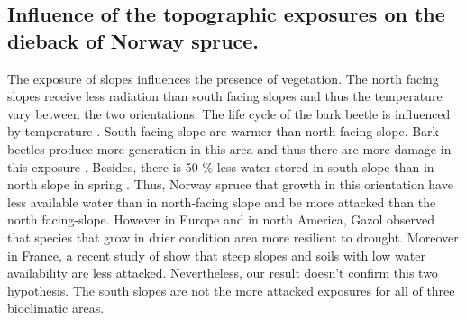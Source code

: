 \documentclass[3p,procedia]{elsarticle}
\begin{document}
\subsection{Influence of the topographic exposures on the dieback of Norway spruce.}


The exposure of slopes influences the presence of vegetation. The north facing slopes receive less radiation than south facing slopes and thus the temperature vary between the two orientations.
The life cycle of the bark beetle is influenced by temperature \citep{baier_phenipscomprehensive_2007}. 
South facing slope are warmer than north facing slope.
Bark beetles produce more generation in this area and thus there are more damage in this exposure \citep{jakus_1995}.
Besides, there is 50 \% less water stored in south slope than in north slope in spring \citep{Rouse_1969}. 
Thus, Norway spruce that growth in this orientation have less available water than in north-facing slope and be more attacked than the north facing-slope.
However in Europe and in north America, Gazol \citep{gazol_2017} observed that species that grow in drier condition area more resilient to drought.
Moreover in France, a recent study of \cite{nardi_drought_2022} show that steep slopes and soils with low water availability are less attacked.
Nevertheless, our result doesn't confirm this  two hypothesis.
The south slopes are not the more attacked exposures for all of three bioclimatic areas.



 

 

\end{document}
